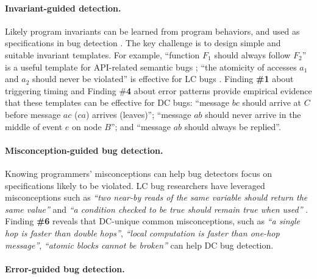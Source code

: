 \paragraph{Invariant-guided detection.}

Likely program invariants can be learned from program
behaviors, and used as specifications in bug detection
\cite{engler01bugs, daikon00, avio.asplos06}.
The key challenge is to design
simple and suitable 
invariant templates.  For example, ``function $F_1$ should
always follow $F_2$'' is a useful template for API-related semantic
bugs \cite{engler01bugs};
``the atomicity of accesses $a_1$ and $a_2$ should never be violated''
is effective for LC bugs \cite{avio.asplos06}.
%
%
Finding {\bf \#1} about triggering timing and Finding
\#{\bf 4} about error patterns provide empirical evidence that these
templates can be effective for DC bugs: ``message $bc$ should
arrive at $C$ before message $ac$ ($ca$) arrives (leaves)''; 
``message $ab$
should never arrive in the middle of event $e$ on node $B$''; and
``message $ab$ should always be replied''.

\paragraph{Misconception-guided bug detection.}

Knowing programmers' misconceptions can help bug detectors
focus on specifications likely to be violated.  LC bug
researchers have leveraged misconceptions such as {\it ``two near-by
  reads of the same variable should return the same value''}
\cite{avio.asplos06} and {\it ``a condition checked to be true should
  remain true when used''} \cite{ifcon.hpca14}.
%
%
Finding {\bf \#6} reveals that DC-unique common misconceptions, such
as {\it ``a single hop is faster than double hops''}, 
{\it ``local computation is   faster than one-hop message''}, 
{\it ``atomic blocks cannot be broken''}
can help DC bug detection.


\paragraph{Error-guided bug detection.} 

